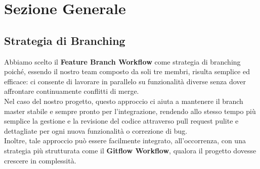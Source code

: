 \section{Sezione Generale}
\subsection{Strategia di Branching}
Abbiamo scelto il \textbf{Feature Branch Workflow} come strategia di branching poiché, essendo il nostro team composto da soli tre membri, risulta semplice ed efficace: ci consente di lavorare in parallelo su funzionalità diverse senza dover affrontare continuamente conflitti di merge. \\Nel caso del nostro progetto, questo approccio ci aiuta a mantenere il branch master stabile e sempre pronto per l’integrazione, rendendo allo stesso tempo più semplice la gestione e la revisione del codice attraverso pull request pulite e dettagliate per ogni nuova funzionalità o correzione di bug. 
\\Inoltre, tale approccio può essere facilmente integrato, all’occorrenza, con una strategia più strutturata come il \textbf{Gitflow Workflow}, qualora il progetto dovesse crescere in complessità.

